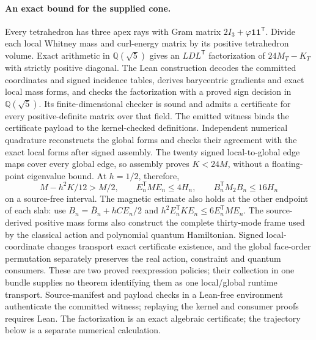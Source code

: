 \paragraph{An exact bound for the supplied cone.}
Every tetrahedron has three apex rays with Gram matrix
\(2I_3+\varphi\mathbf1\mathbf1^{\mathsf T}\).
Divide each local Whitney mass and curl-energy matrix by its positive
tetrahedron volume. Exact arithmetic in \(\mathbb Q(\sqrt5)\) gives an
\(LDL^{\mathsf T}\) factorization of \(24M_T-K_T\) with strictly
positive diagonal. The Lean construction decodes the committed coordinates and signed incidence
tables, derives barycentric gradients and exact local mass forms, and checks
the factorization with a proved sign decision in \(\mathbb Q(\sqrt5)\).
Its finite-dimensional checker is sound and admits a certificate for every
positive-definite matrix over that field. The emitted witness binds the
certificate payload to the kernel-checked definitions. Independent numerical
quadrature reconstructs the global forms and checks their agreement with
the exact local forms after signed assembly.
The twenty signed local-to-global edge maps cover every global edge, so
assembly proves \(K<24M\), without a floating-point eigenvalue bound.
At \(h=1/2\), therefore,
\[
 M-h^2K/12>M/2,\qquad
 E_n^{\mathsf T}ME_n\leq4H_n,\qquad
 B_n^{\mathsf T}M_2B_n\leq16H_n
\]
on a source-free interval. The magnetic estimate also holds at the other
endpoint of each slab: use
\(B_n=\overline B_n+hCE_n/2\) and
\(h^2E_n^{\mathsf T}KE_n\leq6E_n^{\mathsf T}ME_n\).
The source-derived positive mass forms also construct the complete
thirty-mode frame used by the classical action and polynomial quantum
Hamiltonian. Signed local-coordinate changes transport exact certificate
existence, and the global face-order permutation separately preserves the
real action, constraint and quantum consumers. These are two proved
reexpression policies; their collection in one bundle supplies no theorem
identifying them as one local/global runtime transport. Source-manifest and
payload checks in a Lean-free environment authenticate the committed
witness; replaying the kernel and consumer proofs requires Lean.
The factorization is an exact algebraic certificate; the trajectory below
is a separate numerical calculation.

